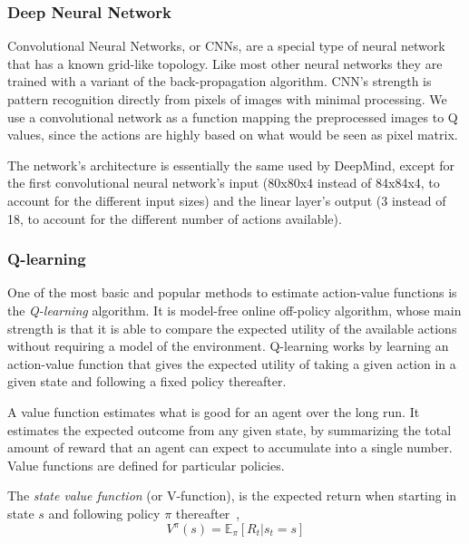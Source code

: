 \documentclass[a4paper]{article}
\begin{document}
\subsubsection{Deep Neural Network}

Convolutional Neural Networks, or CNNs, are a special type of neural network that has a known grid-like topology. Like most other neural networks they are trained with a variant of the back-propagation algorithm. CNN's strength is pattern recognition directly from pixels of images with minimal processing. We use a convolutional network as a function mapping the preprocessed images to Q values, since the actions are highly based on what would be seen as pixel matrix.

The network's architecture is essentially the same used by DeepMind, except for the first convolutional neural network's input (80x80x4 instead of 84x84x4, to account for the different input sizes) and the linear layer's output (3 instead of 18, to account for the different number of actions available).

\subsubsection{Q-learning}

One of the most basic and popular methods to estimate action-value functions is the \emph{Q-learning} algorithm. It is model-free online off-policy algorithm, whose main strength is that it is able to compare the expected utility of the available actions without requiring a model of the environment. Q-learning works by learning an action-value function that gives the expected utility of taking a given action in a given state and following a fixed policy thereafter.

A value function estimates what is good for an agent over the long run. It estimates the expected outcome from any given state, by summarizing the total amount of reward that an agent can expect to accumulate into a single number. Value functions are defined for particular policies.

The \emph{state value function} (or V-function), is the expected return when starting in state $s$ and following policy $\pi$ thereafter~\citep{Sutton1998RL},
%
\begin{equation}
V^\pi(s) = \mathbb{E}_\pi \left[R_t | s_t = s \right]
\end{equation}
\end{document}
